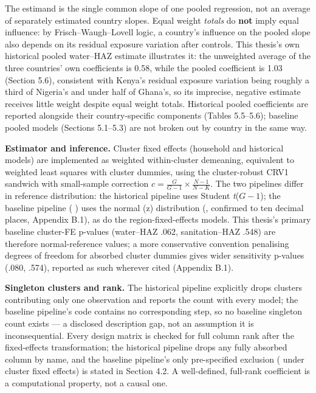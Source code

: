 The estimand is the single common slope of one pooled regression, not an average of separately estimated country slopes. Equal weight \emph{totals} do \textbf{not} imply equal influence: by Frisch--Waugh--Lovell logic, a country's influence on the pooled slope also depends on its residual exposure variation after controls. This thesis's own historical pooled water--HAZ estimate illustrates it: the unweighted average of the three countries' own coefficients is 0.58, while the pooled coefficient is 1.03 (Section 5.6), consistent with Kenya's residual exposure variation being roughly a third of Nigeria's and under half of Ghana's, so its imprecise, negative estimate receives little weight despite equal weight totals. Historical pooled coefficients are reported alongside their country-specific components (Tables 5.5--5.6); baseline pooled models (Sections 5.1--5.3) are not broken out by country in the same way.

\textbf{Estimator and inference.} Cluster fixed effects (household and historical models) are implemented as weighted within-cluster demeaning, equivalent to weighted least squares with cluster dummies, using the cluster-robust CRV1 sandwich with small-sample correction \(c = \frac{G}{G-1}\times\frac{N-1}{N-K}\). The two pipelines differ in reference distribution: the historical pipeline uses Student \emph{t}(\(G-1\)); the baseline pipeline ( \autocite{Seabold2010Statsmodels}) uses the normal (z) distribution (, confirmed to ten decimal places, Appendix B.1), as do the region-fixed-effects models. This thesis's primary baseline cluster-FE p-values (water--HAZ .062, sanitation--HAZ .548) are therefore normal-reference values; a more conservative convention penalising degrees of freedom for absorbed cluster dummies gives wider sensitivity p-values (.080, .574), reported as such wherever cited (Appendix B.1).

\textbf{Singleton clusters and rank.} The historical pipeline explicitly drops clusters contributing only one observation and reports the count with every model; the baseline pipeline's code contains no corresponding step, so no baseline singleton count exists --- a disclosed description gap, not an assumption it is inconsequential. Every design matrix is checked for full column rank after the fixed-effects transformation; the historical pipeline drops any fully absorbed column by name, and the baseline pipeline's only pre-specified exclusion ( under cluster fixed effects) is stated in Section 4.2. A well-defined, full-rank coefficient is a computational property, not a causal one.

